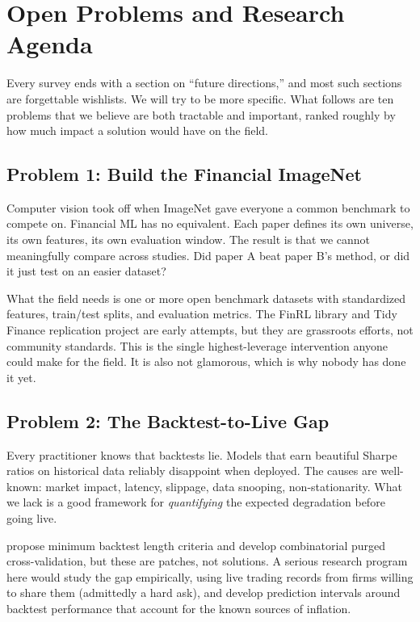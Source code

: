 \section{Open Problems and Research Agenda}\label{sec:open_problems}

Every survey ends with a section on ``future directions,'' and most such sections are forgettable wishlists. We will try to be more specific. What follows are ten problems that we believe are both tractable and important, ranked roughly by how much impact a solution would have on the field.

\subsection{Problem 1: Build the Financial ImageNet}

Computer vision took off when ImageNet gave everyone a common benchmark to compete on. Financial ML has no equivalent. Each paper defines its own universe, its own features, its own evaluation window. The result is that we cannot meaningfully compare across studies. Did paper A beat paper B's method, or did it just test on an easier dataset?

What the field needs is one or more open benchmark datasets with standardized features, train/test splits, and evaluation metrics. The FinRL library \citep{Wang2021} and Tidy Finance replication project are early attempts, but they are grassroots efforts, not community standards. This is the single highest-leverage intervention anyone could make for the field. It is also not glamorous, which is why nobody has done it yet.

\subsection{Problem 2: The Backtest-to-Live Gap}

Every practitioner knows that backtests lie. Models that earn beautiful Sharpe ratios on historical data reliably disappoint when deployed. The causes are well-known: market impact, latency, slippage, data snooping, non-stationarity. What we lack is a good framework for \textit{quantifying} the expected degradation before going live.

\citet{Bailey2014} propose minimum backtest length criteria and \citet{DePrado2018} develop combinatorial purged cross-validation, but these are patches, not solutions. A serious research program here would study the gap empirically, using live trading records from firms willing to share them (admittedly a hard ask), and develop prediction intervals around backtest performance that account for the known sources of inflation.

